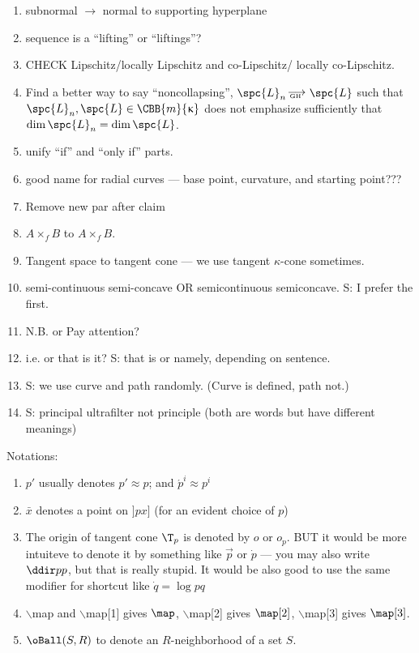 \begin{enumerate}
\item subnormal $\to$ normal to supporting hyperplane

\item sequence is a ``lifting'' or ``liftings''?

\item CHECK Lipschitz/locally Lipschitz and co-Lipschitz/ locally co-Lipschitz.

\item Find a better way to say ``noncollapsing'', $\spc{L}_n\GHto \spc{L}$ such that $\spc{L}_n,\spc{L}\in \CBB{m}{\kappa}$ does not emphasize sufficiently that $\dim\spc{L}_n=\dim\spc{L}$.

\item unify ``if'' and ``only if'' parts.

\item good name for radial curves --- base point, curvature, and starting point???

\item Remove new par after claim

\item $A\times_f B$ to $A\mathrel{{\times}_f} B$.

\item Tangent space to tangent cone --- we use tangent $\kappa$-cone sometimes.

\item semi-continuous semi-concave OR semicontinuous semiconcave.  S: I prefer the first.

\item N.B. or Pay attention?

\item i.e. or that is it? S:  that is or namely, depending on sentence.

\item S: we use curve and path randomly.  (Curve is defined, path not.)

\item S: principal ultrafilter not principle (both are words but have different meanings)

\end{enumerate}

Notations:
\begin{enumerate}
\item $p'$ usually denotes $p'\approx p$; 
and $\acute{p}^i\approx p^i$
\item $\bar x$ denotes a point on  $]p x]$ (for an evident choice of $p$)
\item The origin of tangent cone $\T_p$ is denoted by $o$ or $o_p$. BUT it would be more intuiteve to denote it by something like $\vec p$ or $\dot p$ --- you may also write $\ddir pp$, but that is really stupid.
It would be also good  to use the same modifier for shortcut like $\dot q=\log p q$
\item $\backslash$map and $\backslash$map[1] gives $\map$, $\backslash$map[2] gives $\map[2]$, $\backslash$map[3] gives $\map[3]$.
\item $\oBall(S,R)$  to denote an $R$-neighborhood of a set $S$.
\end{enumerate}

